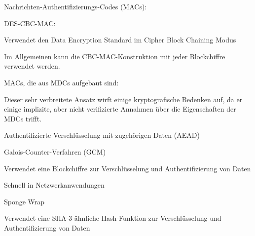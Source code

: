 \documentclass[a4paper]{article}
\begin{document}
\begin{multicols}{3}
\begin{itemize*}
            \item Nachrichten-Authentifizierungs-Codes (MACs):
            \begin{itemize*}
                  \item DES-CBC-MAC:
                  \begin{itemize*}
                        \item Verwendet den Data Encryption Standard im Cipher Block Chaining Modus
                        \item Im Allgemeinen kann die CBC-MAC-Konstruktion mit jeder Blockchiffre verwendet werden.
                  \end{itemize*}
                  \item MACs, die aus MDCs aufgebaut sind:
                  \begin{itemize*}
                        \item Dieser sehr verbreitete Ansatz wirft einige kryptografische Bedenken auf, da er einige implizite, aber nicht verifizierte Annahmen über die Eigenschaften der MDCs trifft.
                  \end{itemize*}
            \end{itemize*}
            \item Authentifizierte Verschlüsselung mit zugehörigen Daten (AEAD)
            \begin{itemize*}
                  \item Galois-Counter-Verfahren (GCM)
                  \begin{itemize*}
                        \item Verwendet eine Blockchiffre zur Verschlüsselung und Authentifizierung von Daten
                        \item Schnell in Netzwerkanwendungen
                  \end{itemize*}
                  \item Sponge Wrap
                  \begin{itemize*}
                        \item Verwendet eine SHA-3 ähnliche Hash-Funktion zur Verschlüsselung und Authentifizierung von Daten
                  \end{itemize*}
            \end{itemize*}
      \end{itemize*}



\end{multicols}
\end{document}
